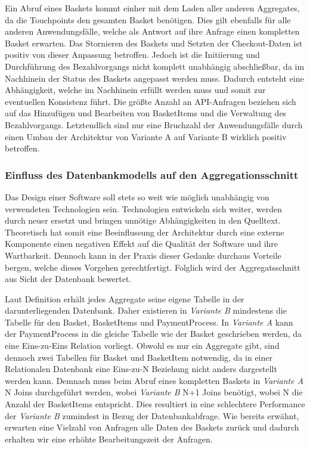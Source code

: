 Ein Abruf eines Baskets kommt einher mit dem Laden aller anderen Aggregates, da die Touchpoints den gesamten Basket benötigen. Dies gilt ebenfalls für alle anderen Anwendungsfälle, welche als Antwort auf ihre Anfrage einen kompletten Basket erwarten. Das Stornieren des Baskets und Setzten der Checkout-Daten ist positiv von dieser Anpassung betroffen. Jedoch ist die Initiierung und Durchführung des Bezahlvorgangs nicht komplett unabhängig abschließbar, da im Nachhinein der Status des Baskets angepasst werden muss. Dadurch entsteht eine Abhängigkeit, welche im Nachhinein erfüllt werden muss und somit zur eventuellen Konsistenz führt. Die größte Anzahl an API-Anfragen beziehen sich auf das Hinzufügen und Bearbeiten von BasketItems und die Verwaltung des Bezahlvorgangs. Letztendlich sind nur eine Bruchzahl der Anwendungsfälle durch einen Umbau der Architektur von Variante A auf Variante B wirklich positiv betroffen.

\subsubsection{Einfluss des Datenbankmodells auf den Aggregationsschnitt}

Das Design einer Software soll stets so weit wie möglich unabhängig von verwendeten Technologien sein. Technologien entwickeln sich weiter, werden durch neuer ersetzt und bringen unnötige Abhängigkeiten in den Quelltext. Theoretisch hat somit eine Beeinflussung der Architektur durch eine externe Komponente einen negativen Effekt auf die Qualität der Software und ihre Wartbarkeit. Dennoch kann in der Praxis dieser Gedanke durchaus Vorteile bergen, welche dieses Vorgehen gerechtfertigt. Folglich wird der Aggregatsschnitt aus Sicht der Datenbank bewertet.

Laut Definition erhält jedes Aggregate seine eigene Tabelle in der darunterliegenden Datenbank. Daher existieren in \emph{Variante B} mindestens die Tabelle für den Basket, BasketItems und PaymentProcess. In \emph{Variante A} kann der PaymentProcess in die gleiche Tabelle wie der Basket geschrieben werden, da eine Eins-zu-Eins Relation vorliegt. Obwohl es nur ein Aggregate gibt, sind dennoch zwei Tabellen für Basket und BasketItem notwendig, da in einer Relationalen Datenbank eine Eins-zu-N Beziehung nicht anders dargestellt werden kann. Demnach muss beim Abruf eines kompletten Baskets in \emph{Variante A} N Joins durchgeführt werden, wobei \emph{Variante B} N+1 Joins benötigt, wobei N die Anzahl der BasketItems entspricht. Dies resultiert in eine schlechtere Performance der \emph{Variante B} zumindest in Bezug der Datenbankabfrage. Wie bereits erwähnt, erwarten eine Vielzahl von Anfragen alle Daten des Baskets zurück und dadurch erhalten wir eine erhöhte Bearbeitungszeit der Anfragen.


